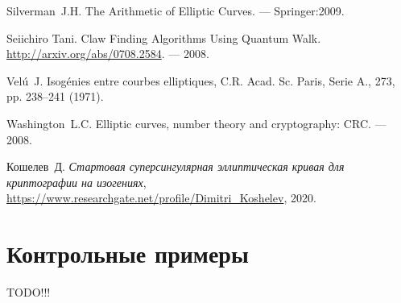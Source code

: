 \documentclass[a4paper,12pt]{article}
\theoremstyle{definition}
\begin{document}
\begin{thebibliography}{1}
Silverman~J.H.
\newblock The Arithmetic of Elliptic Curves. 
--- Springer:2009.



  Seiichiro Tani. 
  \newblock Claw Finding Algorithms Using Quantum Walk. \url{http://arxiv.org/abs/0708.2584}. --- 2008.
  
  
   Vel\'{u}~J. \newblock Isog\'{e}nies entre courbes elliptiques, C.R. Acad. Sc. Paris, Serie A., 273, pp. 238–241 (1971).

Washington~L.C.
\newblock Elliptic curves, number theory and cryptography: CRC.
\newblock --- 2008.


 Кошелев~Д. {\it Стартовая суперсингулярная эллиптическая кривая для криптографии на изогениях}, \url{https://www.researchgate.net/profile/Dimitri_Koshelev}, 2020.


\end{thebibliography}

\newpage 

\appendix
\section{Контрольные примеры}

TODO!!!
\end{document}
